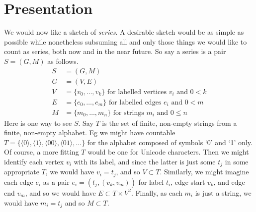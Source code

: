 \documentclass{amsart}%
\newcommand{\mention}[1]{\textit{#1}}%
\theoremstyle{plain}
\theoremstyle{definition}
\theoremstyle{remark}
\theoremstyle{definition}
\theoremstyle{remark}
\begin{document}
\section{Presentation}
\label{s:pres}
We would now like a sketch of \mention{series}. A desirable sketch would be as simple as possible while nonetheless subsuming all and only those things we would like to count as series, both now and in the near future. So say a series is a pair \(S=(G,M)\) as follows.
\begin{align*}
S &= (G,M)\\
G &= (V,E)\\
V &= \{v_0,\ldots,v_k\}\text{ for labelled vertices }v_i\text{ and }0<k\\%
E &= \{e_0,\ldots,e_m\}\text{ for labelled edges }e_i\text{ and }0<m\\%
M &= \{m_0,\ldots,m_n\}\text{ for strings }m_i\text{ and }0\leq n%
\end{align*}
Here is one way to see \(S\). Say \(T\) is the set of finite, non-empty strings from a finite, non-empty alphabet. %
Eg we might have countable \(T=\{\langle 0\rangle,\langle 1\rangle,\langle 00\rangle,\langle 01\rangle,\ldots\}\) for the alphabet composed of symbols `0' and `1' only. Of course, a more fitting \(T\) would be one for Unicode characters. Then we might identify each vertex \(v_i\) with its label, and since the latter is just some \(t_j\) in some appropriate \(T\), we would have \(v_i=t_j\), and so \(V\subset T\). %
Similarly, we might imagine each edge \(e_i\) as a pair \(e_i=(t_j,(v_k,v_m))\) for label \(t_i\), edge start \(v_k\), and edge end \(v_m\), and so we would have \(E\subset T\times V^2\). Finally, as each \(m_i\) is just a string, we would have \(m_i=t_j\) and so \(M\subset T\).
\end{document}
